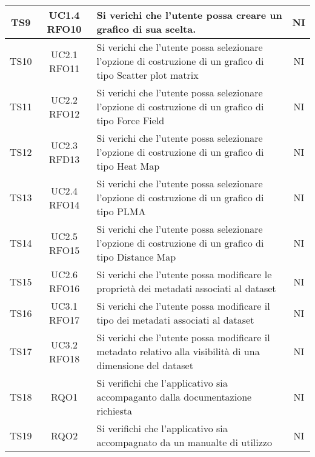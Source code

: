 \documentclass[../piano_di_qualifica.tex]{subfiles}
\begin{document}
\begin{center}
\begin{longtable}{|c|c|p{8.5cm}|c|}
		TS9               & UC1.4 RFO10            & Si verichi che l'utente possa creare un grafico di sua scelta.                                                         & NI                         \\ \hline
		TS10              & UC2.1 RFO11            & Si verichi che l'utente possa  selezionare l’opzione di costruzione di un grafico di tipo Scatter plot matrix          & NI                         \\ \hline
		TS11              & UC2.2 RFO12            & Si verichi che l'utente possa selezionare l’opzione di costruzione di un grafico di tipo Force Field                   & NI                         \\ \hline
		TS12              & UC2.3 RFD13            & Si verichi che l'utente possa selezionare l’opzione di costruzione di un grafico di tipo Heat Map                      & NI                         \\ \hline
		TS13              & UC2.4 RFO14            & Si verichi che l'utente possa selezionare l’opzione di costruzione di un grafico di tipo PLMA                          & NI                         \\ \hline
		TS14              & UC2.5 RFO15            & Si verichi che l'utente possa selezionare l’opzione di costruzione di un grafico di tipo Distance Map                  & NI                         \\ \hline
		TS15              & UC2.6 RFO16            & Si verichi che l'utente possa modificare le proprietà dei metadati associati al dataset                                & NI                         \\ \hline
		TS16              & UC3.1 RFO17            & Si verichi che l'utente possa modificare il tipo dei metadati associati al dataset                                     & NI                         \\ \hline
		TS17              & UC3.2 RFO18            & Si verichi che l'utente possa modificare il metadato relativo alla visibilità di una dimensione del dataset            & NI                         \\ \hline
		TS18              & RQO1                   & Si verifichi che l'applicativo sia accompaganto dalla documentazione richiesta                                         & NI                         \\ \hline
		TS19              & RQO2                   & Si verifichi che l'applicativo sia accompagnato da un manualte di utilizzo                                             & NI                         \\ \hline

\end{longtable}
\end{center}
\end{document}

